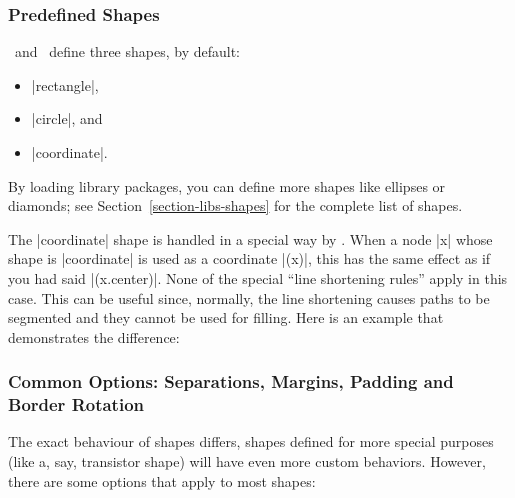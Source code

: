 \subsubsection{Predefined Shapes}

\label{section-nodes-predefined}

\label{section-the-shapes}

\pgfname\ and \tikzname\ define three shapes, by default:
\begin{itemize}
\item
  |rectangle|,
\item
  |circle|, and
\item
  |coordinate|.
\end{itemize}
By loading library packages, you can define more shapes like ellipses
or diamonds; see Section~\ref{section-libs-shapes} for the complete
list of shapes.

\label{section-tikz-coordinate-shape}
The |coordinate| shape is handled in a special way by \tikzname. When
a node |x| whose shape is |coordinate| is used as a coordinate |(x)|,
this has the same effect as if you had said |(x.center)|. None  of the
special ``line shortening rules'' apply in this case. This can be
useful since, normally, the line shortening causes paths to be
segmented and they cannot be used for filling. Here is an example that
demonstrates the difference:
\begin{codeexample}[]
\end{codeexample}



\subsubsection{Common Options: Separations, Margins, Padding and
  Border Rotation}

\label{section-shape-seps}
\label{section-shape-common-options}

The exact behaviour of shapes differs, shapes defined for more
special purposes (like a, say, transistor shape) will have even more
custom behaviors. However, there are some options that apply to most
shapes:

